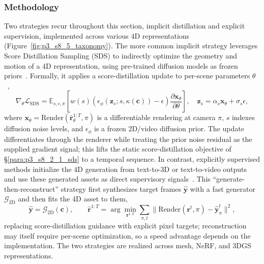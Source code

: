 \subsubsection{Methodology}
\label{subsubsec:p3_s8_5_1_method}
Two strategies recur throughout this section, implicit distillation and explicit supervision, implemented across various 4D representations (Figure~\ref{fig:p3_s8_5_taxonomy}).
The more common implicit strategy leverages Score Distillation Sampling (SDS) to indirectly optimize the geometry and motion of a 4D representation, using pre-trained diffusion models as frozen priors~\cite{singer2023text,zheng2024unified}. Formally, it applies a score-distillation update to per-scene parameters $\theta$~\cite{poole2022dreamfusion},
\begin{equation}
\label{eq:p3_s8_5_sds}
\nabla_\theta\mathcal{L}_{\mathrm{SDS}}
=\mathbb{E}_{s,\epsilon,\pi}\!\left[
 w(s)\left(\epsilon_\phi(\mathbf{z}_s;s,\kappa(\mathbf{c}))-\epsilon\right)
 \frac{\partial\mathbf{x}_\theta}{\partial\theta}\right],
\quad \mathbf{z}_s=\alpha_s\mathbf{x}_\theta+\sigma_s\epsilon,
\end{equation}
where $\mathbf{x}_\theta=\mathrm{Render}(\hat{\mathbf{r}}^{1:T}_\theta,\pi)$ is a differentiable rendering at camera $\pi$, $s$ indexes diffusion noise levels, and $\epsilon_\phi$ is a frozen 2D/video diffusion prior. The update differentiates through the renderer while treating the prior noise residual as the supplied gradient signal; this lifts the static score-distillation objective of §\ref{para:p3_s8_2_1_sds} to a temporal sequence.
In contrast, explicitly supervised methods initialize the 4D generation from text-to-3D or text-to-video outputs and use these generated assets as direct supervisory signals~\cite{zhao2024efficient,wu20244d,yang2024deformable,ling2024align,blattmann2023align,xu2024comp4d}. This ``generate-then-reconstruct'' strategy first synthesizes target frames $\hat{\mathbf{y}}$ with a fast generator $\mathcal{G}_{\text{2D}}$ and then fits the 4D asset to them,
\begin{equation}
\label{eq:p3_s8_5_explicit}
\hat{\mathbf{y}}=\mathcal{G}_{\text{2D}}(\mathbf{c}),\qquad
\hat{\mathbf{r}}^{1:T}=\arg\min_{\mathbf{r}^{1:T}}\sum_{\pi,t}\big\|\mathrm{Render}(\mathbf{r}^{t},\pi)-\hat{\mathbf{y}}^{t}_{\pi}\big\|^2,
\end{equation}
replacing score-distillation guidance with explicit pixel targets; reconstruction may itself require per-scene optimization, so a speed advantage depends on the implementation. The two strategies are realized across mesh, NeRF, and 3DGS representations.

